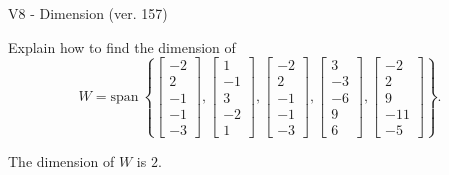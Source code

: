 \begin{exercise}
  \begin{exerciseTitle}V8 - Dimension (ver. 157)\end{exerciseTitle}
  \begin{exerciseStatement}
    Explain how to find the dimension of 
\[W=\mathrm{span}\ \left\{\left[\begin{array}{r}
-2 \\
2 \\
-1 \\
-1 \\
-3
\end{array}\right] , \left[\begin{array}{r}
1 \\
-1 \\
3 \\
-2 \\
1
\end{array}\right] , \left[\begin{array}{r}
-2 \\
2 \\
-1 \\
-1 \\
-3
\end{array}\right] , \left[\begin{array}{r}
3 \\
-3 \\
-6 \\
9 \\
6
\end{array}\right] , \left[\begin{array}{r}
-2 \\
2 \\
9 \\
-11 \\
-5
\end{array}\right]\right\}.\]



  \end{exerciseStatement}
  \begin{exerciseAnswer}
   The dimension of \(W\) is  \(2\).
  


  \end{exerciseAnswer}
\end{exercise}